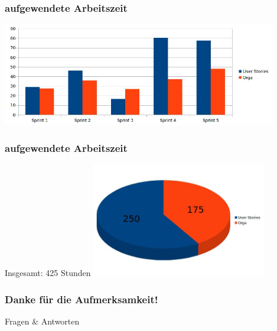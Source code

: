 \documentclass[accentcolor=tud4c,colorbacktitle]{tudbeamer}
\begin{document}
  \begin{frame}
    \frametitle{aufgewendete Arbeitszeit}
    \begin{center}
      \includegraphics[height=4.5cm]{zeiten.jpg}
    \end{center}
  \end{frame}

  \begin{frame}
    \frametitle{aufgewendete Arbeitszeit}
    \begin{center}
      \huge{Insgesamt: 425 Stunden}
      \includegraphics[height=5cm]{zeiten2.jpg}
    \end{center}
  \end{frame}


  \begin{frame}
    \frametitle{Danke für die Aufmerksamkeit!}
    \vspace{2cm}
    \begin{center}
      \huge{Fragen \& Antworten}
    \end{center}
  \end{frame}
\end{document}
